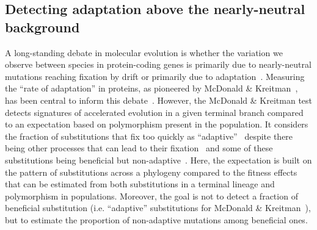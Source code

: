 \documentclass[10pt,letterpaper]{article}
\begin{document}
\subsection*{Detecting adaptation above the nearly-neutral background}

A long-standing debate in molecular evolution is whether the variation we observe between species in protein-coding genes is primarily due to nearly-neutral mutations reaching fixation by drift or primarily due to adaptation~\cite{kimura_evolutionary_1968,ohta_nearly_1992,gillespie_substitution_1994,jensen_importance_2019}.
Measuring the ``rate of adaptation'' in proteins, as pioneered by McDonald \& Kreitman~\cite{mcdonald_adaptative_1991}, has been central to inform this debate~\cite{galtier_half_2024}.
However, the McDonald \& Kreitman test detects signatures of accelerated evolution in a given terminal branch compared to an expectation based on polymorphism present in the population. It considers the fraction of substitutions that fix too quickly as ``adaptive''~\cite{mcdonald_adaptative_1991, smith_adaptive_2002, welch_estimating_2006} despite there being other processes that can lead to their fixation~\cite{galtier_adaptation_2007,rousselle_influence_2019,joseph_increased_2024a} and some of these substitutions being beneficial but non-adaptive~\cite{hartl_compensatory_1996, charlesworth_other_2007, mustonen_fitness_2009, jones_shifting_2017}.
Here, the expectation is built on the pattern of substitutions across a phylogeny compared to the fitness effects that can be estimated from both substitutions in a terminal lineage and polymorphism in populations.
Moreover, the goal is not to detect a fraction of beneficial substitution (i.e. ``adaptive'' substitutions for McDonald \& Kreitman~\cite{mcdonald_adaptative_1991}), but to estimate the proportion of non-adaptive mutations among beneficial ones.
\end{document}
